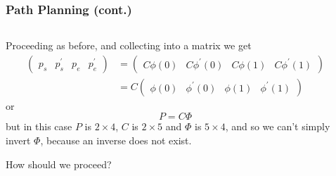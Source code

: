 \documentclass{beamer}
\begin{document}
\begin{frame}\frametitle{Path Planning (cont.)}	
\begin{columns}
\begin{column}{0.8\textwidth}
	Proceeding as before, and collecting into a matrix we get
	\begin{align*}
	\begin{pmatrix} p_s & p_s^{'} & p_e & p_e^{'} \end{pmatrix} &= \begin{pmatrix} C \phi(0) & C \phi^{'}(0) & C \phi(1) & C \phi^{'}(1) \end{pmatrix} \\
	&= C \begin{pmatrix} \phi(0) & \phi^{'}(0) & \phi(1) & \phi^{'}(1) \end{pmatrix}
	\end{align*}
	or
	\[
	P = C \Phi
	\]
	but in this case $P$ is $2\times 4$, $C$ is $2\times 5$ and $\Phi$ is $5\times 4$, and so we can't simply invert $\Phi$, because an inverse does not exist.
	
	How should we proceed?
\end{column}
\begin{column}{0.2\textwidth}  
\end{column}
\end{columns}
\end{frame}
\end{document}
